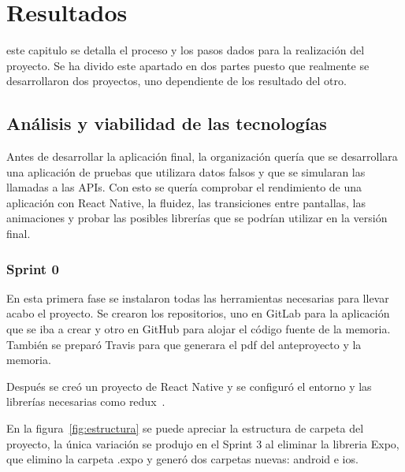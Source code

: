 \chapter{Resultados}
\label{chap:resultados}

 este capitulo se detalla el proceso y los pasos dados para la realización del 
proyecto. Se ha divido este apartado en dos partes puesto que realmente se 
desarrollaron dos proyectos, uno dependiente de los resultado del otro. 

\section{Análisis y viabilidad de las tecnologías}

Antes de desarrollar la aplicación final, la organización quería que se desarrollara una 
aplicación de pruebas que utilizara datos falsos y que se simularan las llamadas a las APIs. Con 
esto se quería comprobar el rendimiento de una aplicación con React Native, la fluidez, las 
transiciones entre pantallas, las animaciones y probar las posibles librerías que se 
podrían utilizar en la versión final.

\subsection{Sprint 0}

En esta primera fase se instalaron todas las herramientas necesarias para llevar acabo el 
proyecto. Se crearon los repositorios, uno en GitLab para la aplicación que se iba 
a crear y otro en GitHub para alojar el código fuente de la memoria. También se 
preparó Travis para que generara el pdf del anteproyecto y la memoria.

Después se creó un proyecto de React Native y se configuró el entorno y las librerías 
necesarias como redux~\cite{REDUX}.

En la figura~\ref{fig:estructura} se puede apreciar la estructura de carpeta del proyecto, la 
única variación se produjo en el Sprint 3 al eliminar la libreria Expo, que elimino la carpeta
.expo y generó dos carpetas nuevas: android e ios.

